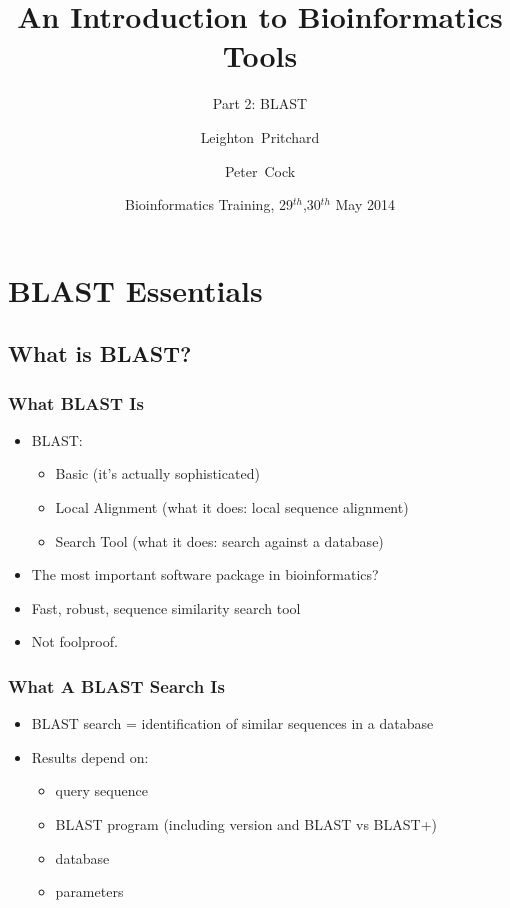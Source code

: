 \documentclass[table]{beamer}
\title[Intro to Bioinformatics] %
{An Introduction to Bioinformatics Tools}
\subtitle{Part 2: BLAST}
\author[Pritchard, Cock] %
{Leighton~Pritchard \and Peter~Cock}
\institute[The James Hutton Institute] %
{
  Information and Computational Sciences\\
  The James Hutton Institute
}
\date[May 2014] %
{Bioinformatics Training, 29$^{th}$,30$^{th}$ May 2014}
\begin{document}
  \frame[plain]{\titlepage}
  
  \section{BLAST Essentials}
  
    \subsection{What is BLAST?}
    \begin{frame}
     \frametitle{What BLAST Is}
     \begin{itemize}
       \item<1-> BLAST:
       \begin{itemize}
         \item<1-> Basic (it's actually sophisticated)
         \item<1-> Local Alignment (what it does: local sequence alignment)
         \item<1-> Search Tool (what it does: search against a database)
       \end{itemize}
       \item<2-> The most important software package in bioinformatics?
       \item<2-> Fast, robust, sequence similarity search tool
       \item<2-> Not foolproof.
     \end{itemize}
    \end{frame}
  
    \begin{frame}
     \frametitle{What A BLAST Search Is}
     \begin{itemize}
       \item BLAST search = identification of similar sequences in a database
       \item Results depend on:
       \begin{itemize}
         \item query sequence
         \item BLAST program (including version and BLAST vs BLAST+)
         \item database
         \item parameters
       \end{itemize}
     \end{itemize}
    \end{frame}  
  
\end{document}
